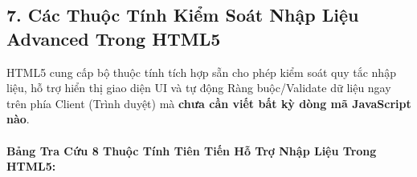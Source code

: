 \subsection{7. Các Thuộc Tính Kiểm Soát Nhập Liệu Advanced Trong HTML5}



\begin{conceptBox}
HTML5 cung cấp bộ thuộc tính tích hợp sẵn cho phép kiểm soát quy tắc nhập liệu, hỗ trợ hiển thị giao diện UI và tự động Ràng buộc/Validate dữ liệu ngay trên phía Client (Trình duyệt) mà \textbf{chưa cần viết bất kỳ dòng mã JavaScript nào}.
\end{conceptBox}

\paragraph{Bảng Tra Cứu 8 Thuộc Tính Tiên Tiến Hỗ Trợ Nhập Liệu Trong HTML5:}

